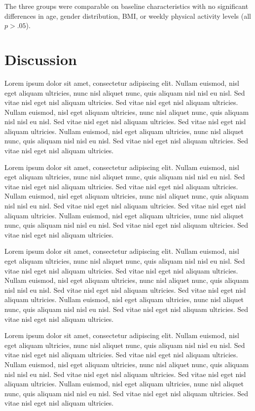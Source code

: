 \documentclass[
  jou,
  longtable,
  nolmodern,
  notxfonts,
  notimes,
  colorlinks=true,linkcolor=blue,citecolor=blue,urlcolor=blue,
  jou]{apa7}
\begin{document}
The three groups were comparable on baseline characteristics with no
significant differences in age, gender distribution, BMI, or weekly
physical activity levels (all \(p > .05\)).

\section{Discussion}\label{discussion}

Lorem ipsum dolor sit amet, consectetur adipiscing elit. Nullam euismod,
nisl eget aliquam ultricies, nunc nisl aliquet nunc, quis aliquam nisl
nisl eu nisl. Sed vitae nisl eget nisl aliquam ultricies. Sed vitae nisl
eget nisl aliquam ultricies. Nullam euismod, nisl eget aliquam
ultricies, nunc nisl aliquet nunc, quis aliquam nisl nisl eu nisl. Sed
vitae nisl eget nisl aliquam ultricies. Sed vitae nisl eget nisl aliquam
ultricies. Nullam euismod, nisl eget aliquam ultricies, nunc nisl
aliquet nunc, quis aliquam nisl nisl eu nisl. Sed vitae nisl eget nisl
aliquam ultricies. Sed vitae nisl eget nisl aliquam ultricies.

Lorem ipsum dolor sit amet, consectetur adipiscing elit. Nullam euismod,
nisl eget aliquam ultricies, nunc nisl aliquet nunc, quis aliquam nisl
nisl eu nisl. Sed vitae nisl eget nisl aliquam ultricies. Sed vitae nisl
eget nisl aliquam ultricies. Nullam euismod, nisl eget aliquam
ultricies, nunc nisl aliquet nunc, quis aliquam nisl nisl eu nisl. Sed
vitae nisl eget nisl aliquam ultricies. Sed vitae nisl eget nisl aliquam
ultricies. Nullam euismod, nisl eget aliquam ultricies, nunc nisl
aliquet nunc, quis aliquam nisl nisl eu nisl. Sed vitae nisl eget nisl
aliquam ultricies. Sed vitae nisl eget nisl aliquam ultricies.

Lorem ipsum dolor sit amet, consectetur adipiscing elit. Nullam euismod,
nisl eget aliquam ultricies, nunc nisl aliquet nunc, quis aliquam nisl
nisl eu nisl. Sed vitae nisl eget nisl aliquam ultricies. Sed vitae nisl
eget nisl aliquam ultricies. Nullam euismod, nisl eget aliquam
ultricies, nunc nisl aliquet nunc, quis aliquam nisl nisl eu nisl. Sed
vitae nisl eget nisl aliquam ultricies. Sed vitae nisl eget nisl aliquam
ultricies. Nullam euismod, nisl eget aliquam ultricies, nunc nisl
aliquet nunc, quis aliquam nisl nisl eu nisl. Sed vitae nisl eget nisl
aliquam ultricies. Sed vitae nisl eget nisl aliquam ultricies.

Lorem ipsum dolor sit amet, consectetur adipiscing elit. Nullam euismod,
nisl eget aliquam ultricies, nunc nisl aliquet nunc, quis aliquam nisl
nisl eu nisl. Sed vitae nisl eget nisl aliquam ultricies. Sed vitae nisl
eget nisl aliquam ultricies. Nullam euismod, nisl eget aliquam
ultricies, nunc nisl aliquet nunc, quis aliquam nisl nisl eu nisl. Sed
vitae nisl eget nisl aliquam ultricies. Sed vitae nisl eget nisl aliquam
ultricies. Nullam euismod, nisl eget aliquam ultricies, nunc nisl
aliquet nunc, quis aliquam nisl nisl eu nisl. Sed vitae nisl eget nisl
aliquam ultricies. Sed vitae nisl eget nisl aliquam ultricies.
\end{document}
